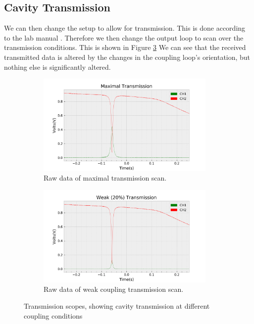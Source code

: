 \subsection{Cavity Transmission}

We can then change the setup to allow for transmission. This is done according to the lab manual \cite{LabProcedure}. Therefore we then change the output loop to scan over the transmission conditions. This is shown in Figure \ref{fig:B_trans_raw} We can see that the received transmitted data is altered by the changes in the coupling loop's orientation, but nothing else is significantly altered.

\begin{figure}[h!]
\centering
\begin{subfigure}[t]{.475\textwidth}
  \centering
  \includegraphics[width=0.95\textwidth]{figures/PartB/scope_6.png}
  \caption{Raw data of maximal transmission scan.}
 \label{fig:B_trans_max_raw}
\end{subfigure}\hfill
\begin{subfigure}[t]{.475\textwidth}
  \centering
  \includegraphics[width=0.95\textwidth]{figures/PartB/scope_5.png}
  \caption{Raw data of weak coupling transmission scan.}
\label{fig:B_trans_weak_raw}
\end{subfigure}
\caption{Transmission scopes, showing cavity transmission at different coupling conditions}
\label{fig:B_trans_raw}
\end{figure}

